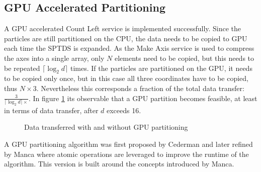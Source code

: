\documentclass[]{article}
\begin{document}
\subsection{GPU Accelerated Partitioning}

A GPU accelerated Count Left service is implemented successfully. Since the particles are still partitioned on the CPU, the data needs to be copied to GPU each time the SPTDS is expanded. As the Make Axis service is used to compress the axes into a single array, only $N$ elements need to be copied, but this needs to be repeated $\lceil \log_2 d \rceil$ times. 
If the particles are partitioned on the GPU, it needs to be copied only once, but in this case all three coordinates have to be copied, thus $
N \times 3$. Nevertheless this corresponds a fraction of the total data transfer: $\frac{3}{\lceil \log_2 d \rceil \times}$. In figure \ref{fig:transfer} its observable that a GPU partition becomes feasible, at least in terms of data transfer, after $d$ exceeds 16. 

\begin{figure}[H]
	\begin{center}
		\caption{Data transferred with and without GPU partitioning}
		\label{fig:transfer}
	\end{center}
\end{figure}


A GPU partitioning algorithm was first proposed by Cederman \cite{GPUQ} and later refined by Manca \cite{CUDAQ} where atomic operations are leveraged to improve the runtime of the algorithm. This version is built around the concepts introduced by Manca. 
\end{document}
